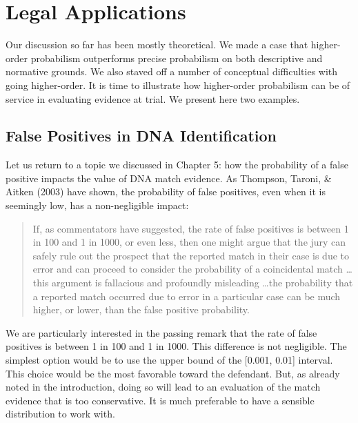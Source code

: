 \documentclass[
  10pt,
  dvipsnames,enabledeprecatedfontcommands]{scrartcl}
\begin{document}
\hypertarget{legal-applications}{%
\section{Legal Applications}\label{legal-applications}}

\label{sec:legal-applications}

Our discussion so far has been mostly theoretical. We made a case that
higher-order probabilism outperforms precise probabilism on both
descriptive and normative grounds. We also staved off a number of
conceptual difficulties with going higher-order. It is time to
illustrate how higher-order probabilism can be of service in evaluating
evidence at trial. We present here two examples.

\hypertarget{false-positives-in-dna-identification}{%
\subsection{False Positives in DNA
Identification}\label{false-positives-in-dna-identification}}

Let us return to a topic we discussed in Chapter 5: how the probability
of a false positive impacts the value of DNA match evidence. As
Thompson, Taroni, \& Aitken (2003) have shown, the probability of false
positives, even when it is seemingly low, has a non-negligible impact:

\begin{quote}
If, as commentators have suggested, the rate of false positives is between 1 in 100 and 1 in 1000, or even less, then one might argue that the jury can safely rule out
the prospect that the reported match in their case is due to error and can proceed to consider the probability of a coincidental match \dots this argument is fallacious and profoundly misleading \dots  the probability that a reported match occurred due to error in a particular case can be much higher, or lower, than the false positive probability. 
\end{quote}

\noindent We are particularly interested in the passing remark that the
rate of false positives is between 1 in 100 and 1 in 1000. This
difference is not negligible. The simplest option would be to use the
upper bound of the {[}0.001, 0.01{]} interval. This choice would be the
most favorable toward the defendant. But, as already noted in the
introduction, doing so will lead to an evaluation of the match evidence
that is too conservative. It is much preferable to have a sensible
distribution to work with.
\end{document}
